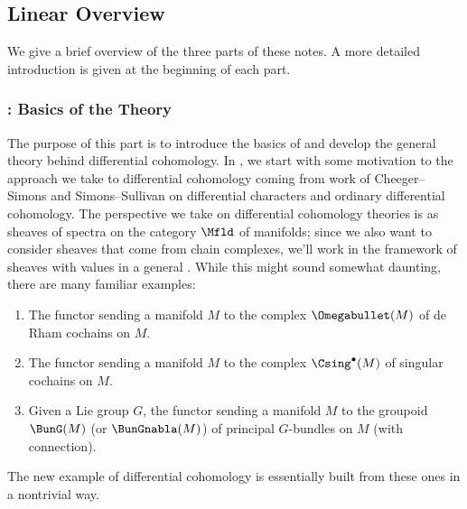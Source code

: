 
\subsection{Linear Overview}

We give a brief overview of the three parts of these notes. A more detailed introduction is given at the beginning of each part.


\subsubsection{\texorpdfstring{}{Part \ref*{part:basics}}: Basics of the Theory}

The purpose of this part is to introduce the basics of and develop the general theory behind differential cohomology.
In , we start with some motivation to the approach we take to differential cohomology coming from work of Cheeger--Simons \cite{MR827262} and Simons--Sullivan \cite{MR2365651} on differential characters and ordinary differential cohomology.
The perspective we take on differential cohomology theories is as sheaves of spectra on the category $ \Mfld $ of manifolds; since we also want to consider sheaves that come from chain complexes, we'll work in the framework of sheaves with values in a general \category.
While this might sound somewhat daunting, there are many familiar examples: 
\begin{enumerate}[(1)]
	\item The functor sending a manifold $ M $ to the complex $ \Omegabullet(M) $ of de Rham cochains on $ M $.

	\item The functor sending a manifold $ M $ to the complex $ \Csing^\bullet(M) $ of singular cochains on $ M $.

	\item Given a Lie group $ G $, the functor sending a manifold $ M $ to the groupoid $ \BunG(M) $ (or $ \BunGnabla(M) $) of principal $ G $-bundles on $ M $ (with connection). 
\end{enumerate}
The new example of differential cohomology is essentially built from these ones in a nontrivial way.

